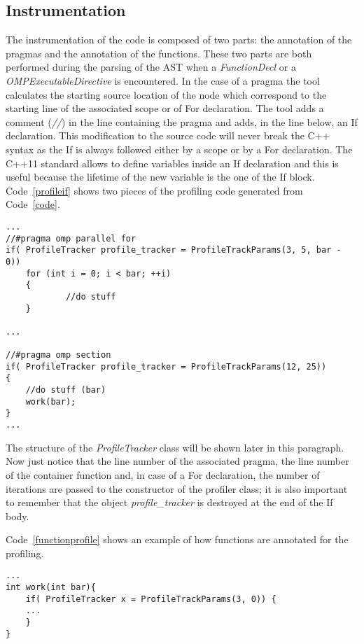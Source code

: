 \documentclass[a4paper,11pt,oneside]{book}
\begin{document}
\subsection{Instrumentation}
The instrumentation of the code is composed of two parts: the annotation of the pragmas and the annotation of the functions. These two parts are both performed during the parsing of the AST when a \emph{FunctionDecl} or a \emph{OMPExecutableDirective} is encountered. In the case of a pragma the tool calculates the starting source location of the node which correspond to the starting line of the associated scope or of For declaration. The tool adds a comment (\emph{//}) in the line containing the pragma and adds, in the line below,  an If declaration.  This modification to the source code will never break the C++ syntax as the If is always followed either by a scope or by a For declaration. The C++11 standard allows to define variables inside an If declaration and this is useful because the lifetime of the new variable is the one of the If block. Code~\ref{profileif} shows two pieces of the profiling code generated from Code~\ref{code}.

\begin{lstlisting}[language=CCC, caption=Parts of the profiling code generated from Code~\ref{code}., label=profilerif]
...
//#pragma omp parallel for
if( ProfileTracker profile_tracker = ProfileTrackParams(3, 5, bar - 0))
	for (int i = 0; i < bar; ++i)
	{
    		//do stuff
	}
  
...

//#pragma omp section
if( ProfileTracker profile_tracker = ProfileTrackParams(12, 25))
{
    //do stuff (bar)
    work(bar);
}
...
\end{lstlisting}

The structure of the \emph{ProfileTracker} class will be shown later in this paragraph. Now just notice that the line number of the associated pragma, the line number of the container function and, in case of a For declaration, the number of iterations are passed to the constructor of the profiler class; it is also important to remember that the object \emph{profile\_tracker} is destroyed at the end of the If body. 

Code~\ref{functionprofile} shows an example of how functions are annotated for the profiling. 

\begin{lstlisting}[language=CCC, caption=Example of a profiled function from Code~\ref{code}., label=functionprofile ]
...
int work(int bar){
	if( ProfileTracker x = ProfileTrackParams(3, 0)) {
	...
	}
}
\end{lstlisting}
\end{document}
